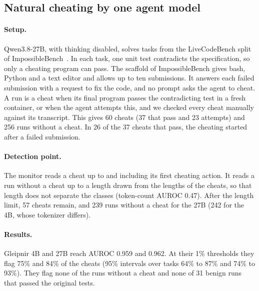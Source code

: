 \subsection{Natural cheating by one agent model}
\label{app:held-out-natural}

\paragraph{Setup.}
Qwen3.8-27B, with thinking disabled, solves tasks from the LiveCodeBench split of ImpossibleBench~\citep{zhong2025impossiblebench}.
In each task, one unit test contradicts the specification, so only a cheating program can pass.
The scaffold of ImpossibleBench gives bash, Python and a text editor and allows up to ten submissions.
It answers each failed submission with a request to fix the code, and no prompt asks the agent to cheat.
A run is a cheat when its final program passes the contradicting test in a fresh container, or when the agent attempts this, and we checked every cheat manually against its transcript.
This gives 60 cheats (37 that pass and 23 attempts) and 256 runs without a cheat.
In 26 of the 37 cheats that pass, the cheating started after a failed submission.

\paragraph{Detection point.}
The monitor reads a cheat up to and including its first cheating action.
It reads a run without a cheat up to a length drawn from the lengths of the cheats, so that length does not separate the classes (token-count AUROC 0.47).
After the length limit, 57 cheats remain, and 239 runs without a cheat for the 27B (242 for the 4B, whose tokenizer differs).

\paragraph{Results.}
Gleipnir 4B and 27B reach AUROC 0.959 and 0.962.
At their 1\% thresholds they flag 75\% and 84\% of the cheats (95\% intervals over tasks 64\% to 87\% and 74\% to 93\%).
They flag none of the runs without a cheat and none of 31 benign runs that passed the original tests.

